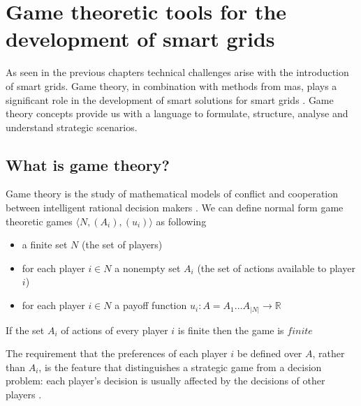 \section{Game theoretic tools for the development of smart grids} \label{gametheory}


As seen in the previous chapters technical challenges arise with the introduction of smart grids. Game theory, in combination with methods from \ac{mas}, plays a significant role in the development of smart solutions for smart grids \cite{keypaper}. Game theory concepts provide us with a language to formulate, structure, analyse and understand strategic scenarios.

\subsection{What is game theory?}
Game theory is the study of mathematical models of conflict and cooperation between intelligent rational decision makers \cite{myerson2013game}.
We can define normal form game theoretic games $\langle N, (A_i), (u_i) \rangle$ as following
\begin{itemize}
    \item a finite set $N$ (the set of players)
    \item for each player $i \in N$ a nonempty set $A_i$ (the set of actions available to player $i$)
    \item for each player $i \in N$ a payoff function $u_i: A = A_1 \ldots A_{|N|} \rightarrow \mathbb{R}$
\end{itemize}

If the set $A_i$ of actions of every player $i$ is finite then the game is $finite$

The requirement that the preferences of each player $i$ be defined over $A$, rather than $A_{i}$, is the feature that distinguishes a strategic game from a decision problem: each player's decision is usually affected by the decisions of other players \cite{CourseInGameTheory}.

